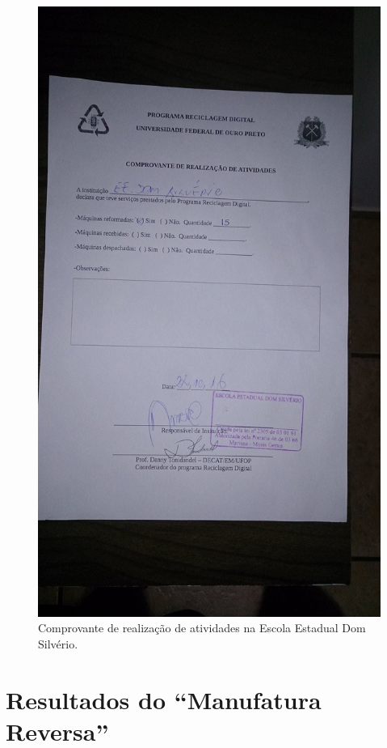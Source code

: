 \documentclass[
	12pt,				%
	openright,			%
	oneside,			%
	a4paper,			%
	english,			%
	spanish,			%
	brazil,				%
	]{abntex2}
\begin{document}
\begin{figure}[H]
	\centering
	\includegraphics[scale=0.2]{figuras/cris10.jpg}
	\caption{Comprovante de realização de atividades na Escola Estadual Dom Silvério.}
	\label{fig:tela10}
\end{figure}

\section{Resultados do ``Manufatura Reversa''}
\end{document}
